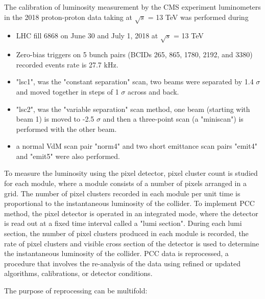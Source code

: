 The calibration of luminosity measurement by the CMS experiment luminometers in the 2018 proton-proton data taking at $\sqrt{s}$ = 13 TeV \cite{CMS-PAS-LUM-18-002} was performed during

\begin{itemize}
\item LHC fill 6868 on June 30 and July 1, 2018 at $\sqrt{s}$ = 13 TeV
\item Zero-bias triggers on 5 bunch pairs (BCIDs 265, 865, 1780, 2192, and 3380)
recorded events rate is 27.7 kHz. 
\item "lsc1", was the "constant separation" scan, two beams were separated by 1.4 $\sigma$ and moved together in steps of 1 $\sigma$ across and back.
\item "lsc2", was the "variable separation" scan method, one beam (starting with beam 1) is moved to -2.5 $\sigma$ and then a three-point scan (a "miniscan") is performed with the other beam.
\item a normal VdM scan pair "norm4" and two short emittance scan pairs "emit4" and "emit5" were also performed.
\end{itemize}

To measure the luminosity using the pixel detector, pixel cluster count is studied for each module, where a module consists of a number of pixels arranged in a grid. The number of pixel clusters recorded in each module per unit time is proportional to the instantaneous luminosity of the collider. To implement PCC method, the pixel detector is operated in an integrated mode, where the detector is read out at a fixed time interval called a "lumi section". During each lumi section, the number of pixel clusters produced in each module is recorded, the rate of pixel clusters and visible cross section of the detector is used to determine the instantaneous luminosity of the collider. PCC data is reprocessed, a procedure that involves the re-analysis of the data using refined or updated algorithms, calibrations, or detector conditions.

\newpage
The purpose of reprocessing can be multifold:

